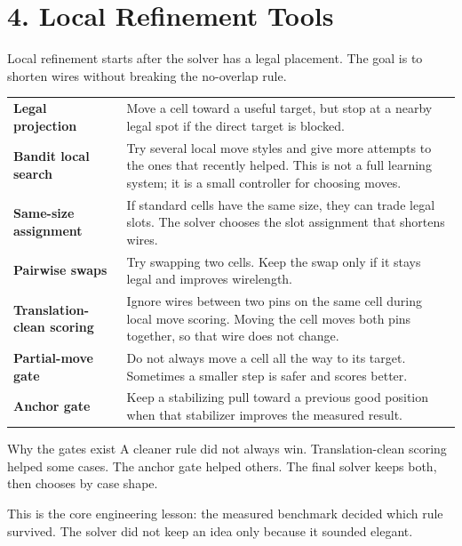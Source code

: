 \documentclass[11pt]{article}
\begin{document}
\newpage

\section{4. Local Refinement Tools}

Local refinement starts after the solver has a legal placement. The goal is to shorten wires without breaking the no-overlap rule.

\begin{tabularx}{\textwidth}{>{\bfseries\color{navy}}p{}X}
Legal projection & Move a cell toward a useful target, but stop at a nearby legal spot if the direct target is blocked. \\
Bandit local search & Try several local move styles and give more attempts to the ones that recently helped. This is not a full learning system; it is a small controller for choosing moves. \\
Same-size assignment & If standard cells have the same size, they can trade legal slots. The solver chooses the slot assignment that shortens wires. \\
Pairwise swaps & Try swapping two cells. Keep the swap only if it stays legal and improves wirelength. \\
Translation-clean scoring & Ignore wires between two pins on the same cell during local move scoring. Moving the cell moves both pins together, so that wire does not change. \\
Partial-move gate & Do not always move a cell all the way to its target. Sometimes a smaller step is safer and scores better. \\
Anchor gate & Keep a stabilizing pull toward a previous good position when that stabilizer improves the measured result. \\
\end{tabularx}

\begin{plainbox}{Why the gates exist}
A cleaner rule did not always win. Translation-clean scoring helped some cases. The anchor gate helped others. The final solver keeps both, then chooses by case shape.
\end{plainbox}

\begin{warningbox}
This is the core engineering lesson: the measured benchmark decided which rule survived. The solver did not keep an idea only because it sounded elegant.
\end{warningbox}
\end{document}
